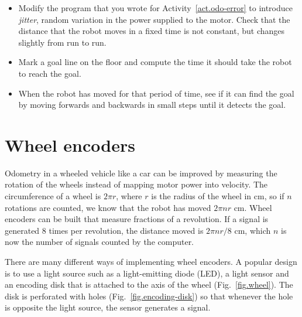 \begin{framed}
\begin{itemize}
\item Modify the program that you wrote for Activity~\ref{act.odo-error} to introduce \emph{jitter}, random variation in the power supplied to the motor. Check that the distance that the robot moves in a fixed time is not constant, but changes slightly from run to run.
\item Mark a goal line on the floor and compute the time it should take the robot to reach the goal.
\item When the robot has moved for that period of time, see if it can find the goal by moving forwards and backwards in small steps until it detects the goal.
\end{itemize}
\end{framed}


\section{Wheel encoders}\label{s.wheel}

Odometry in a wheeled vehicle like a car can be improved by measuring the rotation of the wheels instead of mapping motor power into velocity. The circumference of a wheel is $2\pi r$, where $r$ is the radius of the wheel in cm, so if $n$ rotations are counted, we know that the robot has moved $2\pi n r$ cm. Wheel encoders can be built that measure fractions of a revolution. If a signal is generated $8$ times per revolution, the distance moved is $2\pi nr /8$ cm, which $n$ is now the number of signals counted by the computer.

There are many different ways of implementing wheel encoders. A popular design is to use a light source such as a light-emitting diode (LED), a light sensor and an encoding disk that is attached to the axis of the wheel (Fig.~\ref{fig.wheel}). The disk is perforated with holes (Fig.~\ref{fig.encoding-disk}) so that whenever the hole is opposite the light source, the sensor generates a signal.

